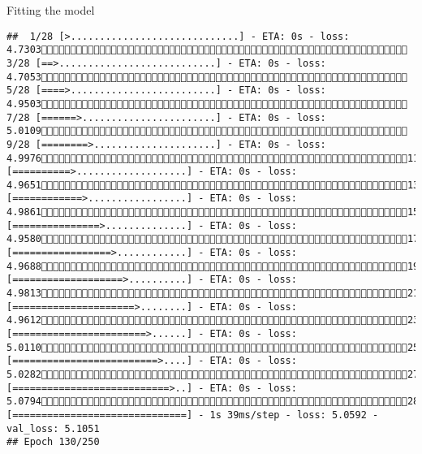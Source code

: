 \documentclass[
  ignorenonframetext,
]{beamer}
\begin{document}
\begin{frame}[fragile]{Fitting the model}
\begin{verbatim}
##  1/28 [>.............................] - ETA: 0s - loss: 4.7303 3/28 [==>...........................] - ETA: 0s - loss: 4.7053 5/28 [====>.........................] - ETA: 0s - loss: 4.9503 7/28 [======>.......................] - ETA: 0s - loss: 5.0109 9/28 [========>.....................] - ETA: 0s - loss: 4.997611/28 [==========>...................] - ETA: 0s - loss: 4.965113/28 [============>.................] - ETA: 0s - loss: 4.986115/28 [===============>..............] - ETA: 0s - loss: 4.958017/28 [=================>............] - ETA: 0s - loss: 4.968819/28 [===================>..........] - ETA: 0s - loss: 4.981321/28 [=====================>........] - ETA: 0s - loss: 4.961223/28 [=======================>......] - ETA: 0s - loss: 5.011025/28 [=========================>....] - ETA: 0s - loss: 5.028227/28 [===========================>..] - ETA: 0s - loss: 5.079428/28 [==============================] - 1s 39ms/step - loss: 5.0592 - val_loss: 5.1051
## Epoch 130/250

\end{verbatim}
\end{frame}
\end{document}
